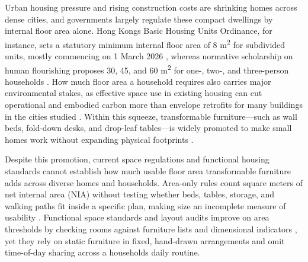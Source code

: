 \documentclass[12pt,letterpaper]{article}
\newcommand{\SubmissionCite}[1]{\unskip\citep{#1}}
\begin{document}
Urban housing pressure and rising construction costs are shrinking homes across dense cities, and governments largely regulate these compact dwellings by internal floor area alone. Hong Kong\textquotesingle s Basic Housing Units Ordinance, for instance, sets a statutory minimum internal floor area of 8 m\textsuperscript{2} for subdivided units, mostly commencing on 1 March 2026 \SubmissionCite{hksar2025basic}, whereas normative scholarship on human flourishing proposes 30, 45, and 60 m\textsuperscript{2} for one-, two-, and three-person households \SubmissionCite{ulrich2025minimum}. How much floor area a household requires also carries major environmental stakes, as effective space use in existing housing can cut operational and embodied carbon more than envelope retrofits for many buildings in the cities studied \SubmissionCite{weber2024hypergraph}. Within this squeeze, transformable furniture---such as wall beds, fold-down desks, and drop-leaf tables---is widely promoted to make small homes work without expanding physical footprints \SubmissionCite{goessler2023adaptive,daglio2023housing}.

Despite this promotion, current space regulations and functional housing standards cannot establish how much usable floor area transformable furniture adds across diverse homes and households. Area-only rules count square meters of net internal area (NIA) without testing whether beds, tables, storage, and walking paths fit inside a specific plan, making size an incomplete measure of usability \SubmissionCite{ozer2022dwelling}. Functional space standards and layout audits improve on area thresholds by checking rooms against furniture lists and dimensional indicators \SubmissionCite{pedro2009dwellings,qaradaghi2022area,freimane2022riga,rakhmatillaeva2025spatial,ulrich2025minimum}, yet they rely on static furniture in fixed, hand-drawn arrangements and omit time-of-day sharing across a household\textquotesingle s daily routine.
\end{document}

